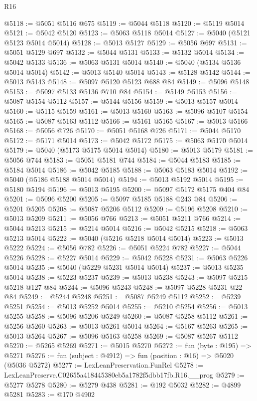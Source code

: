 \begin{lexlean}{R16}
\begin{coremodule}
@5118 := @5051 @5116 @675
@5119 := @5044 @5118
@5120 := @5119 @5014
@5121 := @5042 @5120
@5123 := @5063 @5118 @5014
@5127 := @5040 (@5121 @5123 @5014 @5014)
@5128 := @5013 @5127
@5129 := @5056 @697
@5131 := @5051 @5129 @697
@5132 := @5044 @5131
@5133 := @5132 @5014
@5134 := @5042 @5133
@5136 := @5063 @5131 @5014
@5140 := @5040 (@5134 @5136 @5014 @5014)
@5142 := @5013 @5140 @5014
@5143 := @5128 @5142
@5144 := @5013 @5143
@5148 := @5097 @5120 @5123 @688 @84
@5149 := @5096 @5148
@5153 := @5097 @5133 @5136 @710 @84
@5154 := @5149 @5153
@5156 := @5087 @5154 @5112
@5157 := @5144 @5156
@5159 := @5013 @5157 @5014
@5160 := @5115 @5159
@5161 := @5013 @5160
@5163 := @5096 @5107 @5154
@5165 := @5087 @5163 @5112
@5166 := @5161 @5165
@5167 := @5013 @5166
@5168 := @5056 @726
@5170 := @5051 @5168 @726
@5171 := @5044 @5170
@5172 := @5171 @5014
@5173 := @5042 @5172
@5175 := @5063 @5170 @5014
@5179 := @5040 (@5173 @5175 @5014 @5014)
@5180 := @5013 @5179
@5181 := @5056 @744
@5183 := @5051 @5181 @744
@5184 := @5044 @5183
@5185 := @5184 @5014
@5186 := @5042 @5185
@5188 := @5063 @5183 @5014
@5192 := @5040 (@5186 @5188 @5014 @5014)
@5194 := @5013 @5192 @5014
@5195 := @5180 @5194
@5196 := @5013 @5195
@5200 := @5097 @5172 @5175 @404 @84
@5201 := @5096 @5200
@5205 := @5097 @5185 @5188 @243 @84
@5206 := @5201 @5205
@5208 := @5087 @5206 @5112
@5209 := @5196 @5208
@5210 := @5013 @5209
@5211 := @5056 @766
@5213 := @5051 @5211 @766
@5214 := @5044 @5213
@5215 := @5214 @5014
@5216 := @5042 @5215
@5218 := @5063 @5213 @5014
@5222 := @5040 (@5216 @5218 @5014 @5014)
@5223 := @5013 @5222
@5224 := @5056 @782
@5226 := @5051 @5224 @782
@5227 := @5044 @5226
@5228 := @5227 @5014
@5229 := @5042 @5228
@5231 := @5063 @5226 @5014
@5235 := @5040 (@5229 @5231 @5014 @5014)
@5237 := @5013 @5235 @5014
@5238 := @5223 @5237
@5239 := @5013 @5238
@5243 := @5097 @5215 @5218 @127 @84
@5244 := @5096 @5243
@5248 := @5097 @5228 @5231 @22 @84
@5249 := @5244 @5248
@5251 := @5087 @5249 @5112
@5252 := @5239 @5251
@5254 := @5013 @5252 @5014
@5255 := @5210 @5254
@5256 := @5013 @5255
@5258 := @5096 @5206 @5249
@5260 := @5087 @5258 @5112
@5261 := @5256 @5260
@5263 := @5013 @5261 @5014
@5264 := @5167 @5263
@5265 := @5013 @5264
@5267 := @5096 @5163 @5258
@5269 := @5087 @5267 @5112
@5270 := @5265 @5269
@5271 := @5015 @5270
@5272 := fun (byte : @195) => @5271
@5276 := fun (subject : @4912) => fun (position : @16) => @5020 (@5036 @5272)
@5277 := LexLeanPreservation.FunRel
@5278 := LexLeanPreserve.C02655a418445380eb5a1782f5dbb17fb.R16.__prog
@5279 := @5277 @5278
@5280 := @5279 @438
@5281 := @192 @5032
@5282 := @4899 @5281
@5283 := @170 @4902

\end{coremodule}
\end{lexlean}
